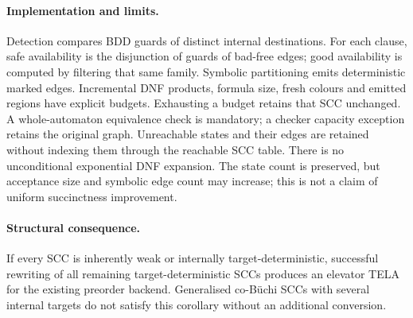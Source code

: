 \paragraph{Implementation and limits.}
Detection compares BDD guards of distinct internal destinations. For each
clause, safe availability is the disjunction of guards of bad-free edges;
good availability is computed by filtering that same family. Symbolic
partitioning emits deterministic marked edges. Incremental DNF products,
formula size, fresh colours and emitted regions have explicit budgets.
Exhausting a budget retains that SCC unchanged. A whole-automaton
equivalence check is mandatory; a checker capacity exception retains the
original graph. Unreachable states and their edges are retained without
indexing them through the reachable SCC table. There is no unconditional
exponential DNF expansion.
The state count is preserved, but acceptance size and symbolic edge count
may increase; this is not a claim of uniform succinctness improvement.

\paragraph{Structural consequence.}
If every SCC is inherently weak or internally target-deterministic,
successful rewriting of all remaining target-deterministic SCCs produces
an elevator TELA for the existing preorder backend. Generalised co-B\"uchi
SCCs with several internal targets do not satisfy this corollary without
an additional conversion.

